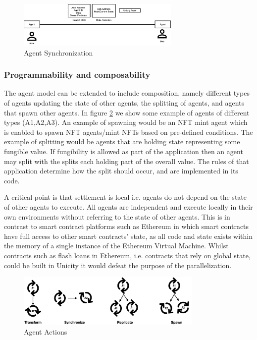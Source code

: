 \documentclass{article}
\begin{document}
\begin{figure}[H]
    \centering
    \includegraphics[width=0.7\textwidth]{AgentSynchronization.png}
    \caption{Agent Synchronization}
    \label{fig:AgentSynch}
\end{figure}


\subsubsection{Programmability and composability}

The agent model can be extended to include composition, namely different types of agents updating the state of other agents, the splitting of agents, and agents that spawn other agents. In figure \ref{fig:AgentSpawn} we show some example of agents of different types (A1,A2,A3). An example of spawning would be an NFT mint agent which is enabled to spawn NFT agents/mint NFTs based on pre-defined conditions. The example of splitting would be agents that are holding state representing some fungible value. If fungibility is allowed as part of the application then an agent may split with the splits each holding part of the overall value. The rules of that application determine how the split should occur, and are implemented in its code.



A critical point is that settlement is local i.e. agents do not depend on the state of other agents to execute. All agents are independent and execute locally in their own environments without referring to the state of other agents. This is in contrast to smart contract platforms such as Ethereum in which smart contracts have full access to other smart contracts' state, as all code and state exists within the memory of a single instance of the Ethereum Virtual Machine. Whilst contracts such as flash loans in Ethereum, i.e. contracts that rely on global state, could be built in Unicity it would defeat the purpose of the parallelization.

\begin{figure}[H]
    \centering
    \includegraphics[width=0.8\textwidth]{Replication.png}
    \caption{Agent Actions}
    \label{fig:AgentSpawn}
\end{figure}
\end{document}
